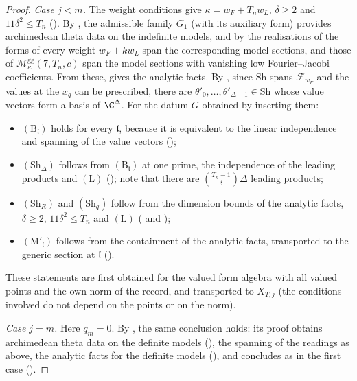 \begin{proof}
\emph{Case $j<m$.} The weight conditions give $\kappa=w_F+T_nw_L$, $\delta\ge2$ and $11\delta^2\le T_n$
(). By , the
admissible family $G_1$ (with its auxiliary form) provides archimedean theta data on the indefinite models, and by
 the realisations of the forms of every weight
$w_F+kw_L$ span the corresponding model sections, and those of $\mathcal M^{\mathrm{gg}}_\kappa(7,T_n,c)$ span the model sections with
vanishing low Fourier--Jacobi coefficients. From these,  gives the
analytic facts. By , since $\mathrm{Sh}$ spans $\mathcal F_{w_F}$ and the
values at the $x_q$ can be prescribed, there are $\theta'_0,\dots,\theta'_{\Delta-1}\in\mathrm{Sh}$ whose value vectors form a basis
of $\C^\Delta$. For the datum $G$ obtained by inserting them:
\begin{itemize}
\item $(\mathrm B_{\mathfrak l})$ holds for every $\mathfrak l$, because it is equivalent to the linear independence and spanning
of the value vectors ();
\item $(\mathrm{Sh}_\Delta)$ follows from $(\mathrm B_{\mathfrak l})$ at one prime, the independence of the leading products and
$(\mathrm L)$ (); note that there are $\binom{T_n-1}\delta\Delta$ leading products;
\item $(\mathrm{Sh}_R)$ and $(\mathrm{Sh}_q)$ follow from the dimension bounds of the analytic facts, $\delta\ge2$, $11\delta^2\le T_n$ and
$(\mathrm L)$ ( and );
\item $(\mathrm M'_{\mathfrak l})$ follows from the containment of the analytic facts, transported to the generic section at
$\mathfrak l$ ().
\end{itemize}
These statements are first obtained for the valued form algebra with all valued points and the own norm of the record,
and transported to $X_{T,j}$ (the conditions involved do not depend on the points or on the norm).

\emph{Case $j=m$.} Here $q_m=0$. By , the same conclusion
holds: its proof obtains archimedean theta data on the definite models
(), the spanning of the readings as above, the analytic
facts for the definite models (), and concludes as in the first
case ().
\end{proof}

